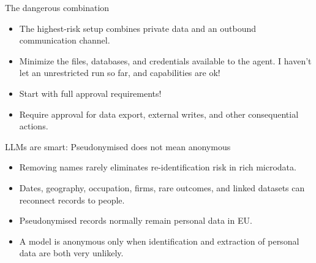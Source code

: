\documentclass[10pt]{beamer}
\begin{document}
\begin{frame}{The dangerous combination}
  \begin{itemize}
    \item The highest-risk setup combines private data and
          an outbound communication channel.
    \item Minimize the files, databases, and credentials available to the agent. I haven't let an unrestricted run so far, and capabilities are ok!
    \item Start with full approval requirements!
    \item Require approval for data export, external writes, and other
          consequential actions.
  \end{itemize}
  \vfill
  \href{https://www.cyber.gov.au/business-government/secure-design/artificial-intelligence/careful-adoption-of-agentic-ai-services}{}\quad
  \href{https://developers.openai.com/api/docs/guides/tools-connectors-mcp}{}
\end{frame}

\begin{frame}{LLMs are smart: Pseudonymised does not mean anonymous}
  \begin{itemize}
    \item Removing names rarely eliminates re-identification risk in rich
          microdata.
    \item Dates, geography, occupation, firms, rare outcomes, and linked
          datasets can reconnect records to people.
    \item Pseudonymised records normally remain personal data in EU.
    \item A model is anonymous only when identification and extraction of
          personal data are both very unlikely.
  \end{itemize}
  \vfill
  \href{https://www.edpb.europa.eu/documents/opinion-of-the-board-art-64/opinion-282024-on-certain-data-protection-aspects-related-to_en}{}\quad
  \href{https://ec.europa.eu/eurostat/web/microdata}{}
\end{frame}
\end{document}
